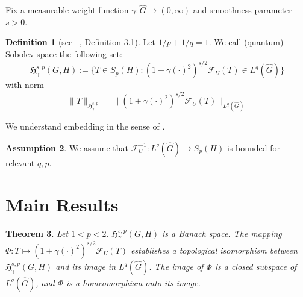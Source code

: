 \documentclass[11pt,a4paper]{article}
\newtheorem{theorem}{Theorem}[section]
\theoremstyle{definition}
\newtheorem{definition}[theorem]{Definition}
\newtheorem{assumption}[theorem]{Assumption}
\newcommand{\F}{\mathcal{F}}
\newcommand{\Ghat}{\widehat{G}}
\newcommand{\norm}[1]{\|#1\|}
\begin{document}
Fix a measurable weight function $\gamma: \Ghat \to (0,\infty)$ and smoothness parameter $s > 0$. 

\begin{definition}[see ~\cite{LakmonMensah2025}, Definition 3.1]
\label{def:sobolev-p-intermediate}
Let $1/p + 1/q = 1$. We call (quantum) Sobolev space the following set:
$$\mathfrak{H}_\gamma^{s,p}(G,H) := \bigg\{T \in S_p(H) : (1 + \gamma(\cdot)^2)^{s/2} \F_U(T) \in L^q(\Ghat)\bigg\}$$
with norm
$$\norm{T}_{\mathfrak{H}_\gamma^{s,p}} = \norm{(1 + \gamma(\cdot)^2)^{s/2} \F_U(T)}_{L^q(\Ghat)}$$
\end{definition}

We understand embedding in the sense of \cite{LakmonMensah2025}. 

\begin{assumption}
\label{ass:p-one}
We assume that $\F_U^{-1}: L^q(\Ghat) \to S_p(H)$ is bounded for relevant $q,p$.
\end{assumption}

\section{Main Results}



\begin{theorem}
\label{thm:topological-iso}
Let $1 < p < 2$. $\mathfrak{H}_\gamma^{s,p}(G, H)$ is a Banach space. The mapping \\$\Phi : T \mapsto (1+\gamma(\cdot)^2)^{s/2}\F_U(T)$ establishes a topological isomorphism between $\mathfrak{H}_\gamma^{s,p}(G, H)$ and its image in $L^q(\hat{G})$. The image of $\Phi$ is a closed subspace of $L^q(\hat{G})$, and $\Phi$ is a homeomorphism onto its image.
\end{theorem}
\end{document}
